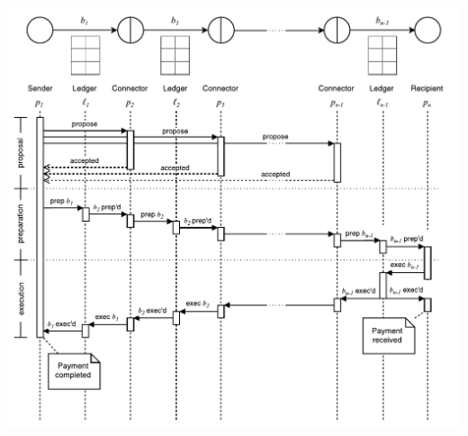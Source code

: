 \documentclass[letterpaper,twocolumn,10pt]{article}
\begin{document}
\begin{minipage}{\textwidth}
    \centering
    \includegraphics[width=\textwidth]{figures/universal-sequence.pdf}
\end{minipage}







\end{document}
